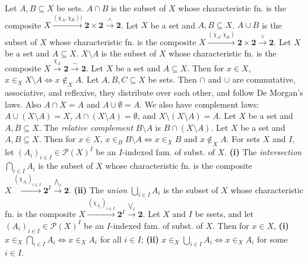  Let $A, B \subseteq X$ be sets. $A \cap B$ is the subset of $X$ whose characteristic fn. is the composite $X \xrightarrow{(\chi_A, \chi_B))} \mathbf{2} \times \mathbf{2} \xrightarrow{\wedge} \mathbf{2}$.
 Let $X$ be a set and $A, B \subseteq X$. $A \cup B$ is the subset of $X$ whose characteristic fn. is the composite $X \xrightarrow{(\chi_A, \chi_B)} \mathbf{2} \times \mathbf{2} \xrightarrow{\vee} \mathbf{2}$.
 Let $X$ be a set and $A \subseteq X$. $X \setminus A$ is the subset of $X$ whose characteristic fn. is the composite $X \xrightarrow{\chi_A} \mathbf{2} \xrightarrow{\neg} \mathbf{2}$.
 Let $X$ be a set and $A \subseteq X$. Then for $x \in X$, $x \in_X X \setminus A \iff x \not \in_X A$.
 Let $A, B, C \subseteq X$ be sets. Then $\cap$ and $\cup$ are commutative, associative, and reflexive, they distribute over each other, and follow De Morgan's laws. Also $A \cap X = A$ and $A \cup \emptyset = A$. We also have complement laws: $A \cup (X \setminus A) = X$, $A \cap (X \setminus A) = \emptyset$, and $X \setminus (X \setminus A) = A$.
 Let $X$ be a set and $A, B \subseteq X$. The \textit{relative complement} $B \setminus A$ is $B \cap (X \setminus A)$.
 Let $X$ be a set and $A, B \subseteq X$. Then for $x \in X$, $x \in_B B \setminus A \iff x \in_X B \text{ and } x \not \in_X A$.
 For sets $X$ and $I$, let $(A_i)_{i \in I} \in \mathscr{P}(X)^I$ be an $I$-indexed fam. of subst. of $X$. \textbf{(i)} The \textit{intersection} $\bigcap_{i \in I} A_i$ is the subset of $X$ whose characteristic fn. is the composite $X \xrightarrow{(\chi_{A_i})_{i \in I}} \mathbf{2}^I \xrightarrow{\bigwedge_I} \mathbf{2}$. \textbf{(ii)} The \textit{union} $\bigcup_{i \in I} A_i$ is the subset of $X$ whose characteristic fn. is the composite $X \xrightarrow{(\chi_{A_i})_{i \in I}} \mathbf{2}^I \xrightarrow{\bigvee_I} \mathbf{2}$.
 Let $X$ and $I$ be ssets, and let $(A_i)_{i \in I} \in \mathscr{P}(X)^I$ be an $I$-indexed fam. of subst. of $X$. Then for $x \in X$, \textbf{(i)} $x \in_X \bigcap_{i \in I} A_i \iff x \in_X A_i$ for all $i \in I$; \textbf{(ii)} $x \in_X \bigcup_{i \in I} A_i \iff x \in_X A_i$ for some $i \in I$.

